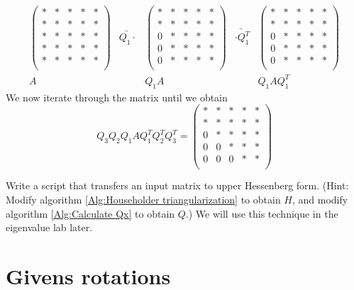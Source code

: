 \[
\begin{array}{ccccc} 
\begin{pmatrix}
* & * & * & * & *\\
* & * & * & * & *\\
* & * & * & * & *\\
* & * & * & * & *\\
* & * & * & * & *\\
\end{pmatrix} 
&\underrightarrow{Q_1 \cdot }&
\begin{pmatrix}
* & * & * & * & *\\
* & * & * & * & *\\
0 & * & * & * & *\\
0 & * & * & * & *\\
0 & * & * & * & *\\
\end{pmatrix} 
&\underrightarrow{\cdot Q_1^T }&
\begin{pmatrix}
* & * & * & * & *\\
* & * & * & * & *\\
0 & * & * & * & *\\
0 & * & * & * & *\\
0 & * & * & * & *\\
\end{pmatrix} 
\\ 
A & & Q_1A & & Q_1 A Q_1^T
  \end{array}
\]
We now iterate through the matrix until we obtain
\begin{equation*}
Q_3 Q_2 Q_1 A Q_1^T Q_2 ^T Q_3^T = 
\begin{pmatrix}
* & * & * & * & *\\
* & * & * & * & *\\
0 & * & * & * & *\\
0 & 0 & * & * & *\\
0 & 0 & 0 & * & *\\
\end{pmatrix} 
\end{equation*}

\begin{problem}
Write a script that transfers an input matrix to upper Hessenberg form. (Hint: Modify algorithm \ref{Alg:Householder triangularization} to obtain $H$, and modify algorithm \ref{Alg:Calculate Qx} to obtain $Q$.) We will use this technique in the eigenvalue lab later.
\end{problem}

\section*{Givens rotations}

